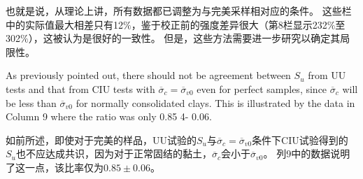 \begin{paracol}{2}
    \switchcolumn

    也就是说，从理论上讲，所有数据都已调整为与完美采样相对应的条件。 这些栏中的实际值最大相差只有12$\%$，鉴于校正前的强度差异很大（第8栏显示232$\%$至302$\%$），这被认为是很好的一致性。 但是，这些方法需要进一步研究以确定其局限性。

    \switchcolumn*

    As previously pointed out, there should not be agreement between $S_u$ from UU tests and that from CIU tests with $\overline{\sigma}_c=\overline{\sigma}_{v0}$ even for perfect samples, since $\overline{\sigma}_c$ will be less than $\overline{\sigma}_{v0}$ for normally consolidated clays. This is illustrated by the data in Column 9 where the ratio was only 0.85 4- 0.06.

    \switchcolumn
   
    如前所述，即使对于完美的样品，UU试验的$S_u$与$\overline{\sigma}_c=\overline{\sigma}_{v0}$条件下CIU试验得到的$S_u$也不应达成共识，因为对于正常固结的黏土，$\overline{\sigma}_c$会小于$\overline{\sigma}_{v0}$。 列9中的数据说明了这一点，该比率仅为$0.85\pm{0.06}$。
\end{paracol}